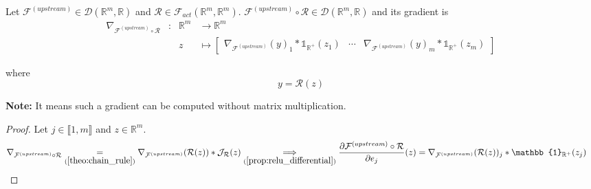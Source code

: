 \documentclass[11pt,en]{elegantpaper}
\newcommand{\Real}{\mathbb{R}}
\begin{document}
\begin{proposition}
  {\normalfont
    Let $\mathcal{F}^{(upstream)} \in \mathcal{D}(\Real^m,\Real)$ and
    $\mathcal{R} \in \mathcal{F}_{act}(\Real^m,\Real^m)$.
    $\mathcal{F}^{(upstream)} \circ \mathcal{R} \in \mathcal{D}(\Real^m,\Real)$ and its gradient is \begin{equation}
      \begin{array}{llll}
        \nabla_{\mathcal{F}^{(upstream)} \circ \mathcal{R}} & : & \Real^m  & \longrightarrow \Real^m \\
        &   & z & \longmapsto \begin{bmatrix}
          \nabla_{\mathcal{F}^{(upstream)}}(y)_1 * \mathbb{1}_{\Real^+}(z_1) & \cdots &
            \nabla_{\mathcal{F}^{(upstream)}}(y)_m * \mathbb{1}_{\Real^+}(z_m)
        \end{bmatrix}
      \end{array}
    \end{equation} \par
    where \begin{equation*}
      y = \mathcal{R}(z)
    \end{equation*}

    \textbf{Note:} It means such a gradient can be computed without matrix multiplication.
  }
\end{proposition}

\begin{proof}
  Let $j \in \llbracket 1,m \rrbracket$ and $z \in \Real^m$.
  \begin{equation*}
    \begin{split}
      \nabla_{\mathcal{F}^{(upstream)} \circ \mathcal{R}} \underset{(\ref{theo:chain_rule})}{=}
        \nabla_{\mathcal{F}^{(upstream)}}(\mathcal{R}(z)) * \mathcal{J}_{\mathcal{R}}(z) &
      \underset{(\ref{prop:relu_differential})}\implies \frac{\partial \mathcal{F}^{(upstream)} \circ \mathcal{R}}{\partial e_j}(z)
        = \nabla_{\mathcal{F}^{(upstream)}}(\mathcal{R}(z))_j * \mathbb{1}_{\Real^+}(z_j)
    \end{split}
  \end{equation*}
\end{proof}
\end{document}
